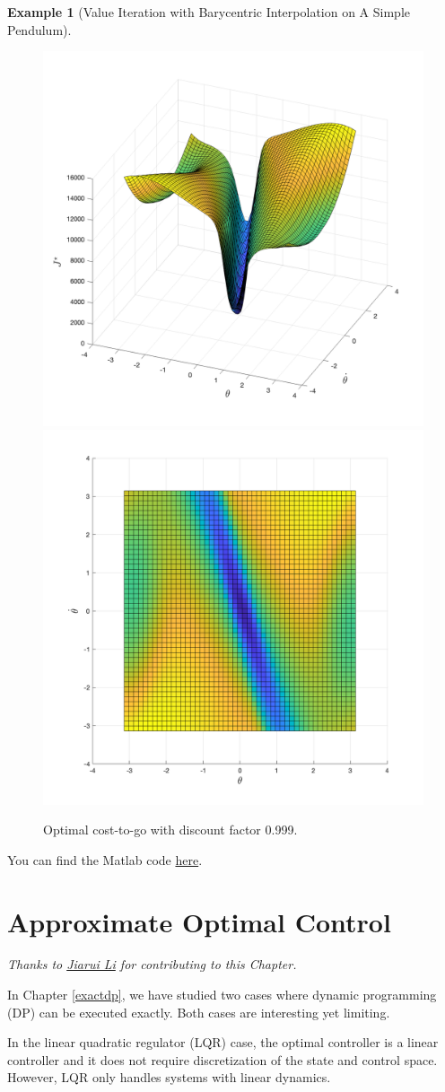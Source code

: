 \documentclass[
]{book}
\theoremstyle{definition}
\theoremstyle{definition}
\newtheorem{example}{Example}[chapter]
\theoremstyle{definition}
\theoremstyle{definition}
\theoremstyle{remark}
\begin{document}
\begin{example}[Value Iteration with Barycentric Interpolation on A Simple Pendulum]
\begin{figure}
{\centering \includegraphics[width=0.5\linewidth]{images/pendulum-VI-J-0.999-1} \includegraphics[width=0.5\linewidth]{images/pendulum-VI-J-0.999-2} 

}

\caption{Optimal cost-to-go with discount factor 0.999.}\label{fig:pendulum-VI-J-999}
\end{figure}

You can find the Matlab code \href{https://github.com/ComputationalRobotics/OptimalControlEstimation-Examples/blob/main/pendulum_value_iteration_barycentric.m}{here}.
\end{example}

\hypertarget{approximatedp}{%
\chapter{Approximate Optimal Control}\label{approximatedp}}

\emph{Thanks to \href{https://jrli.org/}{Jiarui Li} for contributing to this Chapter.}

In Chapter \ref{exactdp}, we have studied two cases where dynamic programming (DP) can be executed exactly. Both cases are interesting yet limiting.

In the linear quadratic regulator (LQR) case, the optimal controller is a linear controller and it does not require discretization of the state and control space. However, LQR only handles systems with linear dynamics.
\end{document}
